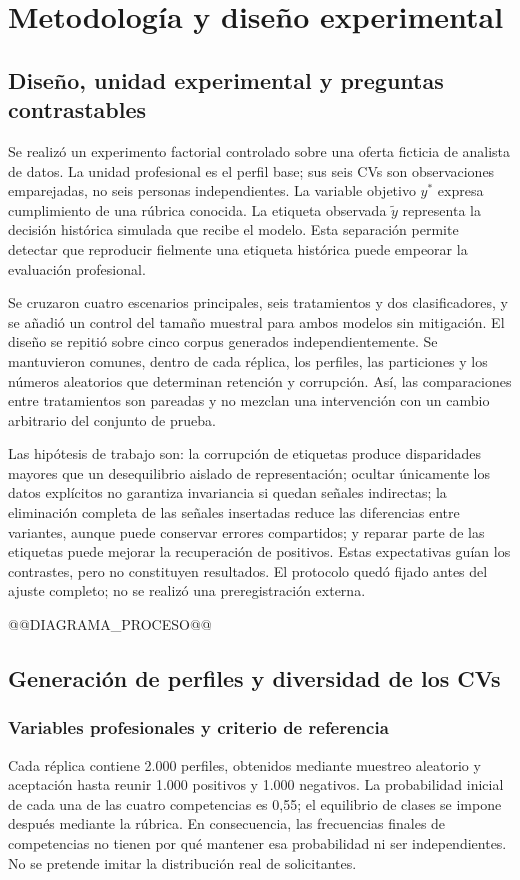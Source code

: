 \chapter{Metodología y diseño experimental}
\label{cap:metodologia}
\section{Diseño, unidad experimental y preguntas contrastables}
Se realizó un experimento factorial controlado sobre una oferta ficticia de analista de datos. La unidad profesional es el perfil base; sus seis CVs son observaciones emparejadas, no seis personas independientes. La variable objetivo $y^*$ expresa cumplimiento de una rúbrica conocida. La etiqueta observada $\tilde y$ representa la decisión histórica simulada que recibe el modelo. Esta separación permite detectar que reproducir fielmente una etiqueta histórica puede empeorar la evaluación profesional.

Se cruzaron cuatro escenarios principales, seis tratamientos y dos clasificadores, y se añadió un control del tamaño muestral para ambos modelos sin mitigación. El diseño se repitió sobre cinco corpus generados independientemente. Se mantuvieron comunes, dentro de cada réplica, los perfiles, las particiones y los números aleatorios que determinan retención y corrupción. Así, las comparaciones entre tratamientos son pareadas y no mezclan una intervención con un cambio arbitrario del conjunto de prueba.

Las hipótesis de trabajo son: la corrupción de etiquetas produce disparidades mayores que un desequilibrio aislado de representación; ocultar únicamente los datos explícitos no garantiza invariancia si quedan señales indirectas; la eliminación completa de las señales insertadas reduce las diferencias entre variantes, aunque puede conservar errores compartidos; y reparar parte de las etiquetas puede mejorar la recuperación de positivos. Estas expectativas guían los contrastes, pero no constituyen resultados. El protocolo quedó fijado antes del ajuste completo; no se realizó una preregistración externa.

@@DIAGRAMA_PROCESO@@

\section{Generación de perfiles y diversidad de los CVs}
\subsection{Variables profesionales y criterio de referencia}
Cada réplica contiene 2.000 perfiles, obtenidos mediante muestreo aleatorio y aceptación hasta reunir 1.000 positivos y 1.000 negativos. La probabilidad inicial de cada una de las cuatro competencias es 0,55; el equilibrio de clases se impone después mediante la rúbrica. En consecuencia, las frecuencias finales de competencias no tienen por qué mantener esa probabilidad ni ser independientes. No se pretende imitar la distribución real de solicitantes.


